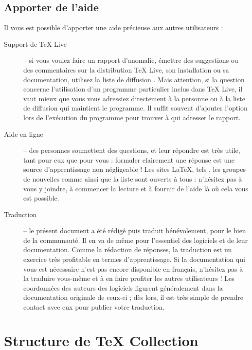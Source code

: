 \documentclass[german, english, french]{article}
\renewcommand{\TL}{\TeX{} Live\xspace}%
\renewcommand{\TK}{\TeX{} Collection\xspace}%
\begin{document}
\subsection{Apporter de l'aide}
Il vous est possible d'apporter une aide précieuse aux autres utilisateurs :
\begin{description}
\item[Support de \TL{}] -- si vous voulez faire un rapport d'anomalie, émettre
  des suggestions ou des commentaires sur la distribution \TL{}, son
  installation ou sa documentation, utilisez la liste de diffusion
  . Mais attention, si la question concerne
  l'utilisation d'un programme particulier inclus dans \TL{}, il vaut mieux que
  vous vous adressiez directement à la personne ou à la liste de diffusion qui
  maintient le programme. Il suffit souvent d'ajouter l'option 
  lors de l'exécution du programme pour trouver à qui adresser le rapport.

\item[Aide en ligne] -- des personnes soumettent des questions, et leur répondre
  est très utile, tant pour eux que pour vous : formuler clairement une réponse
  est une source d'apprentissage non négligeable !  Les sites \LaTeX{}, tels
  , les groupes de nouvelles comme
   ainsi que la liste  sont ouverts à tous :
  n'hésitez pas à vous y joindre, à commencer la lecture et à fournir de l'aide
  là où cela vous est possible.

\item[Traduction] -- le présent document a été rédigé puis traduit bénévolement,
  pour le bien de la communauté. Il en va de même pour l'essentiel des logiciels
  et de leur documentation. Comme la rédaction de réponses, la traduction est un
  exercice très profitable en termes d'apprentissage.  Si la documentation qui
  vous est nécessaire n'est pas encore disponible en français, n'hésitez pas
  à la traduire vous-même et à en faire profiter les autres utilisateurs !  Les
  coordonnées des auteurs des logiciels figurent généralement dans la
  documentation originale de ceux-ci ; dès lors, il est très simple de prendre
  contact avec eux pour publier votre traduction.
\end{description}

\section{Structure de \protect\TK}
\label{sec:overview-tl}
\end{document}
